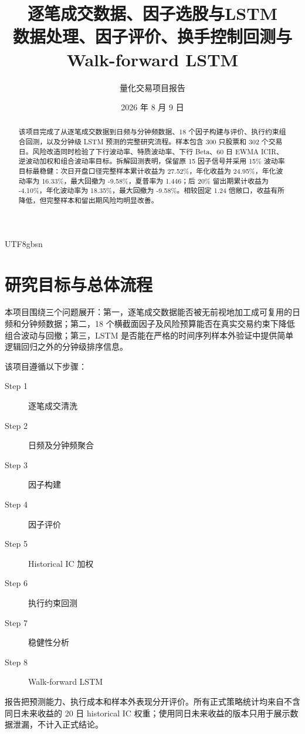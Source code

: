 \documentclass[a4paper,11pt,openany]{report}
\title{\textbf{逐笔成交数据、因子选股与LSTM}\\[0.4em]
\large 数据处理、因子评价、换手控制回测与 Walk-forward LSTM}
\author{量化交易项目报告}
\date{2026 年 8 月 9 日}
\begin{document}
\begin{CJK*}{UTF8}{gbsn}
\renewcommand{\contentsname}{目录}
\renewcommand{\abstractname}{摘要}
\renewcommand{\figurename}{图}
\renewcommand{\tablename}{表}

\maketitle

\begin{abstract}
该项目完成了从逐笔成交数据到日频与分钟频数据、18 个因子构建与评价、执行约束组合回测，以及分钟级 LSTM 预测的完整研究流程。样本包含 300 只股票和 302 个交易日。风险改造同时检验了下行波动率、特质波动率、下行 Beta、60 日 EWMA ICIR、逆波动加权和组合波动率目标。拆解回测表明，保留原 15 因子信号并采用 15\% 波动率目标最稳健：次日开盘口径完整样本累计收益为 27.52\%，年化收益为 24.95\%，年化波动率为 16.33\%，最大回撤为 -9.58\%，夏普率为 1.446；后 20\% 留出期累计收益为 -4.10\%，年化波动率为 18.35\%，最大回撤为 -9.58\%。相较固定 1.24 倍敞口，收益有所降低，但完整样本和留出期风险均明显改善。
\end{abstract}

\tableofcontents
\clearpage

\chapter{研究目标与总体流程}

本项目围绕三个问题展开：第一，逐笔成交数据能否被无前视地加工成可复用的日频和分钟频数据；第二，18 个横截面因子及风险预算能否在真实交易约束下降低组合波动与回撤；第三，LSTM 是否能在严格的时间序列样本外验证中提供简单逻辑回归之外的分钟级排序信息。


\noindent 该项目遵循以下步骤：
\begin{description}
    \item[Step 1] 逐笔成交清洗
    \item[Step 2] 日频及分钟频聚合
    \item[Step 3] 因子构建
    \item[Step 4] 因子评价
    \item[Step 5] Historical IC 加权
    \item[Step 6] 执行约束回测
    \item[Step 7] 稳健性分析
    \item[Step 8] Walk-forward LSTM
\end{description}


\noindent 报告把预测能力、执行成本和样本外表现分开评价。所有正式策略统计均来自不含同日未来收益的 20 日 historical IC 权重；使用同日未来收益的版本只用于展示数据泄漏，不计入正式结论。


\end{CJK*}
\end{document}
